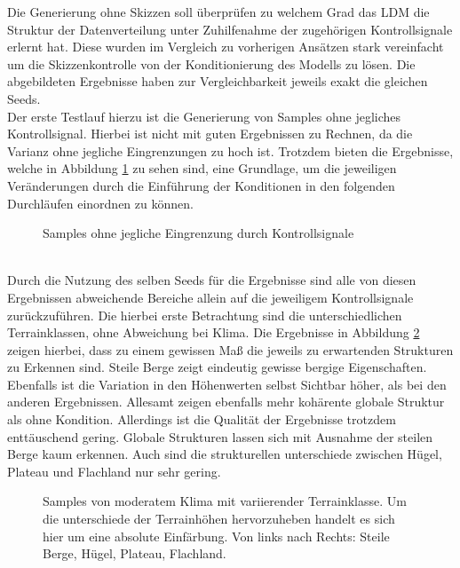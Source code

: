 Die Generierung ohne Skizzen soll überprüfen zu welchem Grad das LDM die Struktur der Datenverteilung unter Zuhilfenahme der zugehörigen Kontrollsignale erlernt hat. Diese wurden im Vergleich zu vorherigen Ansätzen stark vereinfacht um die Skizzenkontrolle von der Konditionierung des Modells zu lösen. Die abgebildeten Ergebnisse haben zur Vergleichbarkeit jeweils exakt die gleichen Seeds. \\
Der erste Testlauf hierzu ist die Generierung von Samples ohne jegliches Kontrollsignal. Hierbei ist nicht mit guten Ergebnissen zu Rechnen, da die Varianz ohne jegliche Eingrenzungen zu hoch ist. Trotzdem bieten die Ergebnisse, welche in Abbildung \ref{fig:unc_terrain_noclass} zu sehen sind, eine Grundlage, um die jeweiligen Veränderungen durch die Einführung der Konditionen in den folgenden Durchläufen einordnen zu können.
\begin{figure}[htbp]
    \centering
    \caption{Samples ohne jegliche Eingrenzung durch Kontrollsignale}
    \label{fig:unc_terrain_noclass}
\end{figure} \\
Durch die Nutzung des selben Seeds für die Ergebnisse sind alle von diesen Ergebnissen abweichende Bereiche allein auf die jeweiligem Kontrollsignale zurückzuführen. Die hierbei erste Betrachtung sind die unterschiedlichen Terrainklassen, ohne Abweichung bei Klima. Die Ergebnisse in Abbildung \ref{fig:unc_terrain} zeigen hierbei, dass zu einem gewissen Maß die jeweils zu erwartenden Strukturen zu Erkennen sind. Steile Berge zeigt eindeutig gewisse bergige Eigenschaften. Ebenfalls ist die Variation in den Höhenwerten selbst Sichtbar höher, als bei den anderen Ergebnissen. Allesamt zeigen ebenfalls mehr kohärente globale Struktur als ohne Kondition. Allerdings ist die Qualität der Ergebnisse trotzdem enttäuschend gering. Globale Strukturen lassen sich mit Ausnahme der steilen Berge kaum erkennen. Auch sind die strukturellen unterschiede zwischen Hügel, Plateau und Flachland nur sehr gering. 
\begin{figure}[htbp]
    \centering
    \caption{Samples von moderatem Klima mit variierender Terrainklasse. Um die unterschiede der Terrainhöhen hervorzuheben handelt es sich hier um eine absolute Einfärbung. Von links nach Rechts: Steile Berge, Hügel, Plateau, Flachland.}
    \label{fig:unc_terrain}
\end{figure} \\
